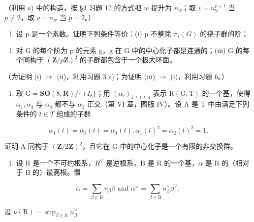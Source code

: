 \begin{enumerate}
（利用 \(a\)) 中的构造，按 §4 习题 12 的方式把 \(w\) 提升为 \(n_w\)；取 \(v = n_w^{p+1}\) 当 \(p \neq 2\)，取 \(v = n_w\) 当 \(p = 2\)。）

\begin{enumerate}
\def\labelenumi{\arabic{enumi})}
\setcounter{enumi}{6}
\tightlist
\item
  设 p 是一个素数。证明下列条件等价：(i) p 不整除 \(\pi_{1}(G)\) 的挠子群的阶；
\end{enumerate}

\begin{enumerate}
\def\labelenumi{(\roman{enumi})}
\setcounter{enumi}{1}
\tightlist
\item
  对 G 的每个阶为 p 的元素 g，g 在 G 中的中心化子都是连通的；(iii) G 的每个同构于 \((\mathbf{Z}/p\mathbf{Z})^{2}\) 的子群都包含于一个极大环面。
\end{enumerate}

（为证明 (i) \(\Longrightarrow\) (ii)，利用习题 3 \(c\))；为证明 (iii) \(\Longrightarrow\) (i)，利用习题 6。）

\begin{enumerate}
\def\labelenumi{\arabic{enumi})}
\setcounter{enumi}{7}
\tightlist
\item
  取 \(\mathrm{G} = \mathbf{SO}(8, \mathbf{R}) / \{\pm I_8\}\)；用 \((\alpha_i)_{1 \leq i \leq 4}\) 表示 \(\mathrm{R}(\mathrm{G}, \mathrm{T})\) 的一个基，使得 \(\alpha_1, \alpha_3\) 与 \(\alpha_4\) 都不与 \(\alpha_2\) 正交（第 VI 章，图版 IV）。设 A 是 T 中由满足下列条件的 \(t \in T\) 组成的子群
\end{enumerate}

\[
\alpha_ {1} (t) = \alpha_ {3} (t) = \alpha_ {4} (t), \alpha_ {1} (t) ^ {2} = \alpha_ {2} (t) ^ {2} = 1.
\]

证明 A 同构于 \((\mathbf{Z}/2\mathbf{Z})^{2}\)，且它在 G 中的中心化子是一个有限的非交换群。

\begin{enumerate}
\def\labelenumi{\arabic{enumi})}
\setcounter{enumi}{8}
\tightlist
\item
  设 R 是一个不可约根系，\(R^{\vee}\) 是逆根系，B 是 R 的一个基，\(\alpha\) 是 R 的（相对于 B 的）最高根。置
\end{enumerate}

\[
\alpha = \sum_ {\beta \in \mathrm{B}} n _ {\beta} \beta \text { and } \alpha^ {\vee} = \sum_ {\beta \in \mathrm{B}} n _ {\beta} ^ {\vee} \beta^ {\vee};
\]

设 \(\nu (\mathrm{R}) = \sup_{\beta \in \mathrm{B}}n_{\beta}^{\vee}\)


\end{enumerate}
